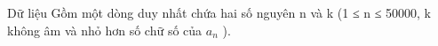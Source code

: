 Dữ liệu
Gồm một dòng duy nhất chứa hai số nguyên n và k (1 ≤ n ≤ 50000, k không âm và nhỏ hơn số chữ số của $a_{n}$ ).